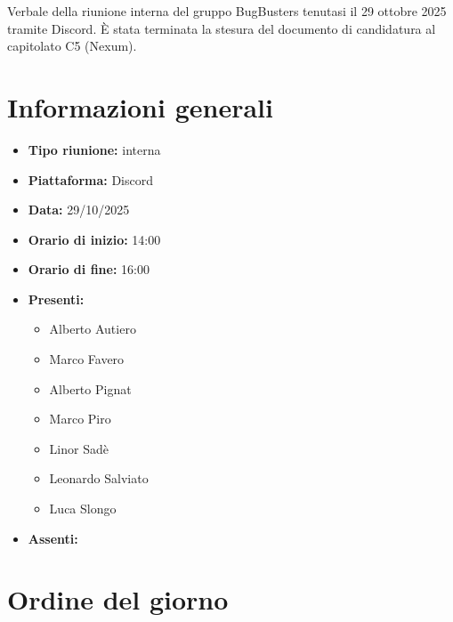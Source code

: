 \documentclass[a4paper,12pt]{article}
\begin{document}
\vspace{0.5cm}

\begin{center}
\begin{tcolorbox}[colback=secondaryblue!10,colframe=secondaryblue,width=0.9\textwidth,arc=3mm,boxrule=0.8pt,title={\bfseries Abstract}]
Verbale della riunione interna del gruppo BugBusters tenutasi il 29 ottobre 2025 tramite Discord. È stata terminata la stesura del documento di candidatura al capitolato C5 (Nexum).
\end{tcolorbox}
\end{center}

\newpage

\tableofcontents
\newpage


\section{Informazioni generali}

\begin{itemize}
    \item \textbf{Tipo riunione:} interna
    \item \textbf{Piattaforma:} Discord
    \item \textbf{Data:} 29/10/2025
    \item \textbf{Orario di inizio:} 14:00
    \item \textbf{Orario di fine:} 16:00
    \item \textbf{Presenti:}
    \begin{itemize}[leftmargin=1.5em, itemsep=3pt, label={\rule[0.5ex]{0.4em}{0.4em}}]
        \item Alberto Autiero
        \item Marco Favero
        \item Alberto Pignat
        \item Marco Piro
        \item Linor Sadè
        \item Leonardo Salviato
        \item Luca Slongo
    \end{itemize}
    \item \textbf{Assenti:}

\end{itemize}

\section{Ordine del giorno}
\end{document}
